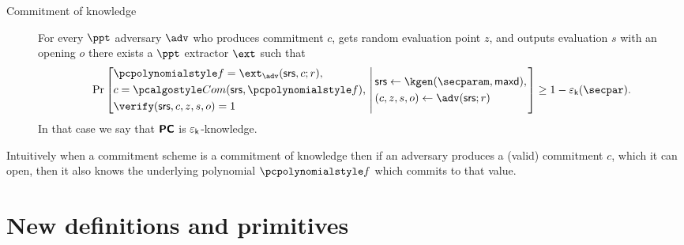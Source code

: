 \documentclass[runningheads,11pt]{llncs}
\begin{document}
\begin{description}
\item[Commitment of knowledge] For every $\ppt$ adversary $\adv$ who produces
  commitment $c$, gets random evaluation point $z$, and outputs evaluation $s$
  with an opening $o$ there exists a $\ppt$ extractor $\ext$ such that
\[
  \Pr \left[
    \begin{aligned}
      & \p{f} = \ext_\adv(\srs, c; r),\\
      & c = \com(\srs, \p{f}),\\
      & \verify(\srs, c, z, s, o) = 1
    \end{aligned}
    \,\left|\,
      \vphantom{
        \begin{aligned}
          & \\
          & \\
          &
        \end{aligned}
        }
    \begin{aligned}
      & \srs \gets \kgen(\secparam, \maxdeg),\\
      & (c, z, s, o) \gets \adv(\srs; r)
    \end{aligned}
  \right.\right]
  \geq 1 - \epsk(\secpar).
\]
In that case we say that $\bm{\mathsf{PC}}$ is $\varepsilon_{\mathsf{k}}$-knowledge.
\end{description}
Intuitively when a commitment scheme is a commitment of knowledge then if an
adversary produces a (valid) commitment $c$, which it can open, then it also
knows the underlying polynomial $\p{f}$ which commits to that value.

\section{New definitions and primitives}
\end{document}
